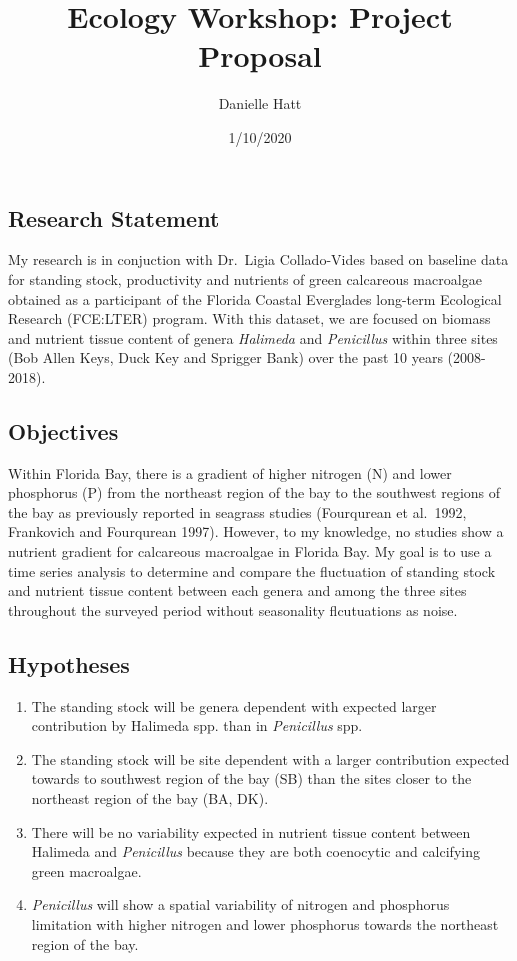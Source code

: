 \documentclass[]{article}
\title{Ecology Workshop: Project Proposal}
\author{Danielle Hatt}
\date{1/10/2020}
\providecommand{\tightlist}{%
  \setlength{\itemsep}{0pt}\setlength{\parskip}{0pt}}
\begin{document}
\maketitle

\hypertarget{research-statement}{%
\subsection{Research Statement}\label{research-statement}}

My research is in conjuction with Dr.~Ligia Collado-Vides based on
baseline data for standing stock, productivity and nutrients of green
calcareous macroalgae obtained as a participant of the Florida Coastal
Everglades long-term Ecological Research (FCE:LTER) program. With this
dataset, we are focused on biomass and nutrient tissue content of genera
\emph{Halimeda} and \emph{Penicillus} within three sites (Bob Allen
Keys, Duck Key and Sprigger Bank) over the past 10 years (2008-2018).

\hypertarget{objectives}{%
\subsection{Objectives}\label{objectives}}

Within Florida Bay, there is a gradient of higher nitrogen (N) and lower
phosphorus (P) from the northeast region of the bay to the southwest
regions of the bay as previously reported in seagrass studies
(Fourqurean et al.~1992, Frankovich and Fourqurean 1997). However, to my
knowledge, no studies show a nutrient gradient for calcareous macroalgae
in Florida Bay. My goal is to use a time series analysis to determine
and compare the fluctuation of standing stock and nutrient tissue
content between each genera and among the three sites throughout the
surveyed period without seasonality flcutuations as noise.

\hypertarget{hypotheses}{%
\subsection{Hypotheses}\label{hypotheses}}

\begin{enumerate}
\def\labelenumi{(\arabic{enumi})}
\tightlist
\item
  The standing stock will be genera dependent with expected larger
  contribution by Halimeda spp. than in \emph{Penicillus} spp.
\item
  The standing stock will be site dependent with a larger contribution
  expected towards to southwest region of the bay (SB) than the sites
  closer to the northeast region of the bay (BA, DK).
\item
  There will be no variability expected in nutrient tissue content
  between Halimeda and \emph{Penicillus} because they are both
  coenocytic and calcifying green macroalgae.
\item
  \emph{Penicillus} will show a spatial variability of nitrogen and
  phosphorus limitation with higher nitrogen and lower phosphorus
  towards the northeast region of the bay.
\end{enumerate}
\end{document}
